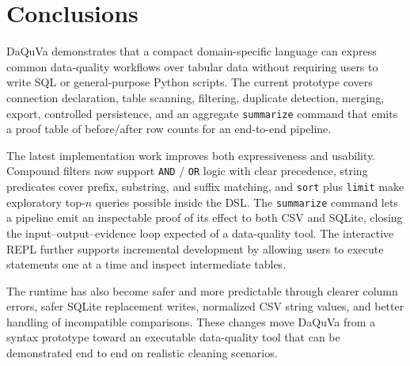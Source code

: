 \chapter*{Conclusions}

DaQuVa demonstrates that a compact domain-specific language can express common
data-quality workflows over tabular data without requiring users to write SQL
or general-purpose Python scripts. The current prototype covers connection
declaration, table scanning, filtering, duplicate detection, merging, export,
controlled persistence, and an aggregate \texttt{summarize} command that emits a
proof table of before/after row counts for an end-to-end pipeline.

The latest implementation work improves both expressiveness and usability.
Compound filters now support \texttt{AND} / \texttt{OR} logic with clear
precedence, string predicates cover prefix, substring, and suffix matching,
and \texttt{sort} plus \texttt{limit} make exploratory top-$n$ queries possible
inside the DSL. The \texttt{summarize} command lets a pipeline emit an
inspectable proof of its effect to both CSV and SQLite, closing the
input--output--evidence loop expected of a data-quality tool. The interactive
REPL further supports incremental development by allowing users to execute
statements one at a time and inspect intermediate tables.

The runtime has also become safer and more predictable through clearer column
errors, safer SQLite replacement writes, normalized CSV string values, and
better handling of incompatible comparisons. These changes move DaQuVa from a
syntax prototype toward an executable data-quality tool that can be demonstrated
end to end on realistic cleaning scenarios.
